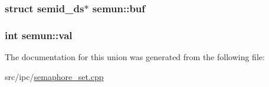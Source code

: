 \hypertarget{unionsemun_c6b6428d07d4147fd2cc698b53555bed}{
\subsubsection[{buf}]{\setlength{\rightskip}{0pt plus 5cm}struct semid\_\-ds$\ast$ {\bf semun::buf}}}
\label{unionsemun_c6b6428d07d4147fd2cc698b53555bed}


\hypertarget{unionsemun_c6121ecb6d04a024e07e12bd71b94031}{
\subsubsection[{val}]{\setlength{\rightskip}{0pt plus 5cm}int {\bf semun::val}}}
\label{unionsemun_c6121ecb6d04a024e07e12bd71b94031}




The documentation for this union was generated from the following file:\begin{CompactItemize}
\item 
src/ipc/\hyperlink{semaphore__set_8cpp}{semaphore\_\-set.cpp}\end{CompactItemize}
